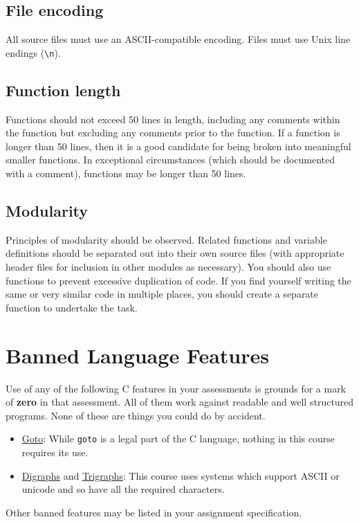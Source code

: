 \documentclass{article}
\begin{document}
\subsection{File encoding}
All source files must use an ASCII-compatible encoding. 
Files must use Unix line endings (\texttt{\textbackslash n}).

\subsection{Function length}
Functions should not exceed 50 lines in length, including any comments within the function but excluding any
comments prior to the function.
If a function is longer than 50 lines, then it is a good candidate for being broken into meaningful smaller functions.
In exceptional circumstances (which should be documented with a comment), functions may be longer than 50 lines.

\subsection{Modularity}
Principles of modularity should be observed.
Related functions and variable definitions should be separated out into their own source files (with appropriate header files for inclusion in other modules as necessary).
You should also use functions to prevent excessive duplication of code.
If you find yourself writing the same or very similar code in multiple places, you should create a separate function to undertake the task.

\section{Banned Language Features}
Use of any of the following C features in your assessments is grounds for a mark of \textbf{zero} in that assessment.
All of them work against readable and well structured programs.
None of these are things you could do by accident.

\begin{itemize}
\item \underline{Goto}: While \texttt{goto} is a legal part of the C language, nothing in this course requires its use.
\item \underline{Digraphs} and \underline{Trigraphs}: This course uses systems which support ASCII or unicode and so have all the required characters.
\end{itemize}

\noindent Other banned features may be listed in your assignment specification.
\end{document}
